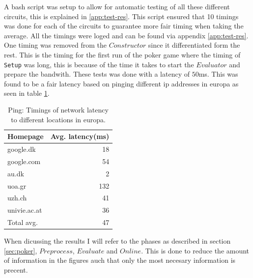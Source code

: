 \documentclass[twoside,11pt,openright]{report}
\begin{document}
A bash script was setup to allow for automatic testing of all these different circuits, this is explained in \ref{app:test-res}. This script ensured that 10 timings was done for each of the circuits to guarantee more fair timing when taking the average. All the timings were loged and can be found via appendix \ref{app:test-res}. One timing was removed from the $Constructor$ since it differentiated form the rest. This is the timing for the first run of the poker game where the timing of \verb|Setup| was long, this is because of the time it takes to start the $Evaluator$ and prepare the bandwith. These tests was done with a latency of $50$ms. This was found to be a fair latency based on pinging different ip addresses in europa as seen in table \ref{table:ping}. 

\begin{table}
\centering
\begin{tabular}{l || r}
Homepage & Avg. latency(ms)    \\
\hline
google.dk    &  18    \\
google.com   &  54    \\
au.dk        &   2    \\
uoa.gr       & 132    \\
uzh.ch       &  41    \\
univie.ac.at &  36    \\
\hline
Total avg.   &  47
\end{tabular}
\caption{Ping: Timings of network latency to different locations in europa.}
\label{table:ping}
\end{table}

When dicussing the results I will refer to the phases as described in section \ref{sec:poker}, $Preprocess$, $Evaluate$ and $Online$. This is done to reduce the amount of information in the figures auch that only the most necesary information is precent.

\bigskip
\end{document}
